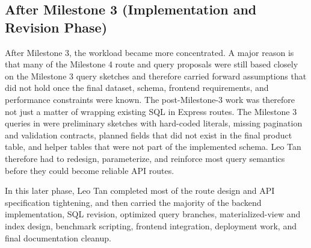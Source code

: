 \documentclass[10pt]{article}
\begin{document}
\subsection*{After Milestone 3 (Implementation and Revision Phase)}
After Milestone 3, the workload became more concentrated. A major reason is
that many of the Milestone 4 route and query proposals were still based closely
on the Milestone 3 query sketches and therefore carried forward assumptions
that did not hold once the final dataset, schema, frontend requirements, and
performance constraints were known. The post-Milestone-3 work was therefore
not just a matter of wrapping existing SQL in Express routes. The Milestone 3
queries in  were preliminary sketches with
hard-coded literals, missing pagination and validation contracts, planned fields
that did not exist in the final product table, and helper tables that were not
part of the implemented schema. Leo Tan therefore had to redesign, parameterize,
and reinforce most query semantics before they could become reliable API
routes.

In this later phase, Leo Tan completed most of the route design and API
specification tightening, and then carried the majority of the backend
implementation, SQL revision, optimized query branches, materialized-view and
index design, benchmark scripting, frontend integration, deployment work, and
final documentation cleanup.
\end{document}
